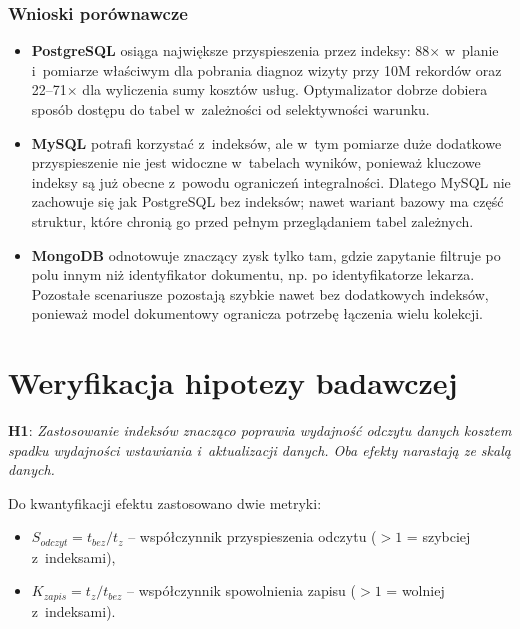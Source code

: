\documentclass[12pt,a4paper]{article}
\begin{document}
\subsubsection{Wnioski porównawcze}

\begin{itemize}[noitemsep]
    \item \textbf{PostgreSQL} osiąga największe przyspieszenia przez indeksy: 88$\times$ w~planie i~pomiarze właściwym dla pobrania diagnoz wizyty przy 10M rekordów oraz 22--71$\times$ dla wyliczenia sumy kosztów usług. Optymalizator dobrze dobiera sposób dostępu do tabel w~zależności od selektywności warunku.
    \item \textbf{MySQL} potrafi korzystać z~indeksów, ale w~tym pomiarze duże dodatkowe przyspieszenie nie jest widoczne w~tabelach wyników, ponieważ kluczowe indeksy są już obecne z~powodu ograniczeń integralności. Dlatego MySQL nie zachowuje się jak PostgreSQL bez indeksów; nawet wariant bazowy ma część struktur, które chronią go przed pełnym przeglądaniem tabel zależnych.
    \item \textbf{MongoDB} odnotowuje znaczący zysk tylko tam, gdzie zapytanie filtruje po polu innym niż identyfikator dokumentu, np. po identyfikatorze lekarza. Pozostałe scenariusze pozostają szybkie nawet bez dodatkowych indeksów, ponieważ model dokumentowy ogranicza potrzebę łączenia wielu kolekcji.
\end{itemize}


\section{Weryfikacja hipotezy badawczej}

\textbf{H1}: \textit{Zastosowanie indeksów znacząco poprawia wydajność odczytu danych kosztem spadku wydajności wstawiania i~aktualizacji danych. Oba efekty narastają ze skalą danych.}

Do kwantyfikacji efektu zastosowano dwie metryki:
\begin{itemize}[noitemsep]
    \item $S_{odczyt} = t_{bez} / t_{z}$ -- współczynnik przyspieszenia odczytu ($>1$ = szybciej z~indeksami),
    \item $K_{zapis} = t_{z} / t_{bez}$ -- współczynnik spowolnienia zapisu ($>1$ = wolniej z~indeksami).
\end{itemize}
\end{document}
